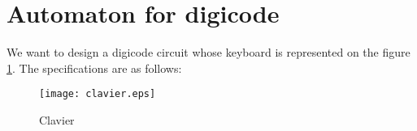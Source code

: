 \documentclass{article}
\begin{document}
{%
%
%

\newpage

\section{Automaton for digicode}

We want to design a digicode circuit whose keyboard is
represented on the figure \ref{Fig:keyboard}. 
The specifications are as follows:

\begin{figure}[H]\centering
  \texttt{[image: clavier.eps]}
  \caption{Clavier}
  \label{Fig:keyboard}
\end{figure}

}
\end{document}
